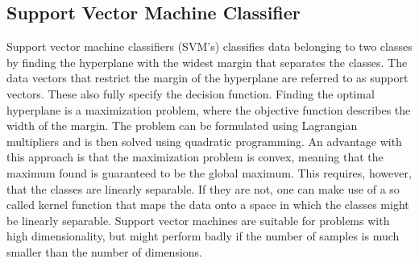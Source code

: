 \subsection{Support Vector Machine Classifier}
Support vector machine classifiers (SVM's) classifies data belonging to two classes by finding the hyperplane with the widest margin that separates the classes. The data vectors that restrict the margin of the hyperplane are referred to as support vectors. These also fully specify the decision function. Finding the optimal hyperplane is a maximization problem, where the objective function describes the width of the margin. The problem can be formulated using Lagrangian multipliers and is then solved using quadratic programming. An advantage with this approach is that the maximization problem is convex, meaning that the maximum found is guaranteed to be the global maximum. This requires, however, that the classes are linearly separable. If they are not, one can make use of a so called kernel function that maps the data onto a space in which the classes might be linearly separable. Support vector machines are suitable for problems with high dimensionality, but might perform badly if the number of samples is much smaller than the number of dimensions. \cite{Berwick03SVM}